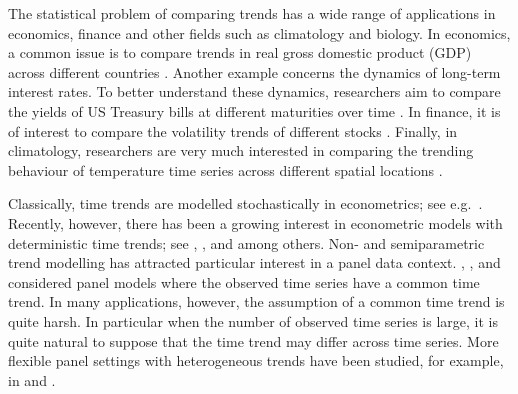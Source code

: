 \documentclass[a4paper,12pt]{article}
\begin{document}
The statistical problem of comparing trends has a wide range of applications in economics, finance and other fields such as climatology and biology. In economics, a common issue is to compare trends in real gross domestic product (GDP) across different countries \citep[cp.][]{Grier1989}. 
Another example concerns the dynamics of long-term interest rates. To better understand these dynamics, researchers aim to compare the yields of US Treasury bills at different maturities over time \citep[cp.][]{Park2009}. In finance, it is of interest to compare the volatility trends of different stocks \citep[cp.][]{Nyblom2000}. Finally, in climatology, researchers are very much interested in comparing the trending behaviour of temperature time series across different spatial locations \citep[cp.][]{KarolyWu2005}. 


Classically, time trends are modelled stochastically in econometrics; see e.g.\ \cite{Stock1988}. Recently, however, there has been a growing interest in econometric models with deterministic time trends; see \cite{Cai2007}, \cite{Atak2011}, \cite{Robinson2012} and \cite{ChenGaoLi2012} among others. Non- and semiparametric trend modelling has attracted particular interest in a panel data context. \cite{LiChenGao2010}, \cite{Atak2011}, \cite{Robinson2012} and \cite{ChenGaoLi2012} considered panel models where the observed time series have a common time trend. In many applications, however, the assumption of a common time trend is quite harsh. In particular when the number of observed time series is large, it is quite natural to suppose that the time trend may differ across time series. More flexible panel settings with heterogeneous trends have been studied, for example, in \cite{Zhang2012} and \cite{Hidalgo2014}. 
\end{document}
